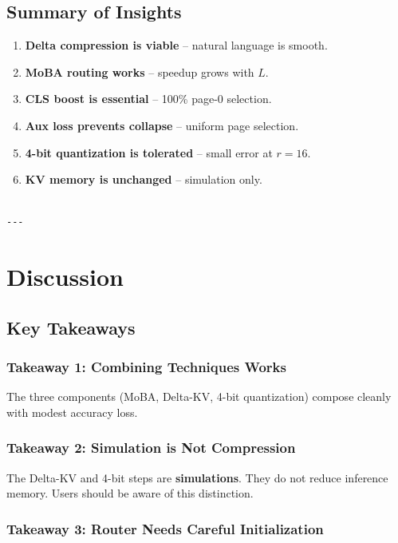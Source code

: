 \subsection{Summary of Insights}

\begin{enumerate}
\item \textbf{Delta compression is viable} -- natural language is smooth.
\item \textbf{MoBA routing works} -- speedup grows with $L$.
\item \textbf{CLS boost is essential} -- 100\% page-0 selection.
\item \textbf{Aux loss prevents collapse} -- uniform page selection.
\item \textbf{4-bit quantization is tolerated} -- small error at $r = 16$.
\item \textbf{KV memory is unchanged} -- simulation only.
\end{enumerate}
\begin{lstlisting}

---
\end{lstlisting}

\section{Discussion}

\subsection{Key Takeaways}

\subsubsection{Takeaway 1: Combining Techniques Works}

The three components (MoBA, Delta-KV, 4-bit quantization) compose cleanly 
with modest accuracy loss.

\subsubsection{Takeaway 2: Simulation is Not Compression}

The Delta-KV and 4-bit steps are \textbf{simulations}. They do not reduce 
inference memory. Users should be aware of this distinction.

\subsubsection{Takeaway 3: Router Needs Careful Initialization}

